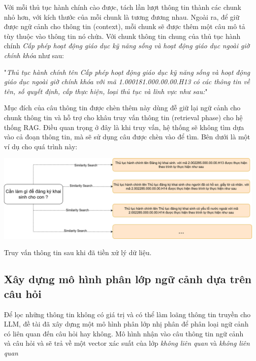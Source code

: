 \documentclass[a4paper, 12pt, openany]{book}
\begin{document}
Với mỗi thủ tục hành chính cào được, tách lần lượt thông tin thành các chunk nhỏ hơn, với kích thước của mỗi chunk 
là tương đương nhau. Ngoài ra, để giữ được ngữ cảnh cho thông tin (context), mỗi chunk sẽ được thêm một câu mô tả tùy thuộc vào thông tin nó chứa.
Với chunk thông tin chung của thủ tục hành chính \textit{Cấp phép hoạt động giáo dục kỹ năng sống và hoạt động giáo dục ngoài giờ chính khóa} như sau:

\vspace{0.5cm}
"\textit{Thủ tục hành chính tên Cấp phép hoạt động giáo dục kỹ năng sống và hoạt động giáo dục ngoài giờ chính khóa với mã 1.000181.000.00.00.H13 có các thông tin về  tên, số quyết định, cấp thực hiện, loại thủ tục và lĩnh vực như sau:}"

Mục đích của câu thông tin được chèn thêm này dùng đễ giữ lại ngữ cảnh cho chunk thông tin và hỗ trợ cho khâu truy vấn thông tin (retrieval phase) cho hệ thống RAG.
Điều quan trọng ở đây là khi truy vấn, hệ thống sẽ không tìm dựa vào cả đoạn thông tin, mà sẽ sử dụng câu
được chèn vào để tìm. Bên dưới là một ví dụ cho quá trình này:

\begin{minipage}{\linewidth}
    \centering
    \includegraphics[width=\linewidth]{./assets/images/search.drawio.png}
    \captionsetup{type=figure}
    \caption{Truy vấn thông tin sau khi đã tiền xử lý dữ liệu.}
\end{minipage}
\vspace{0.5cm}

\subsection{Xây dựng mô hình phân lớp ngữ cảnh dựa trên câu hỏi}

Để lọc những thông tin không có giá trị và có thể làm loãng thông tin truyền cho LLM, 
đề tài đã xây dựng một mô hình phân lớp nhị phân để phân loại ngữ cảnh có liên quan đến câu hỏi hay không.
Mô hình nhận vào câu thông tin ngữ cảnh và câu hỏi và sẽ trả về một vector xác suất của lớp \textit{không liên quan} và \textit{không liên quan}
\end{document}
